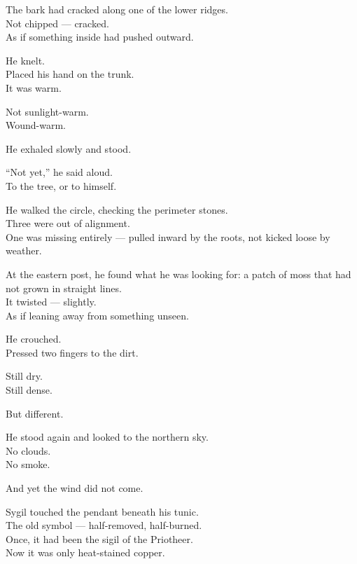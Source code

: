 \documentclass[12pt]{article}
\begin{document}
The bark had cracked along one of the lower ridges.\\
Not chipped — cracked.\\
As if something inside had pushed outward.

\vspace{1em}

He knelt.\\
Placed his hand on the trunk.\\
It was warm.

Not sunlight-warm.\\
Wound-warm.

He exhaled slowly and stood.

\vspace{1em}

“Not yet,” he said aloud.\\
To the tree, or to himself.

\vspace{1em}

He walked the circle, checking the perimeter stones.\\
Three were out of alignment.\\
One was missing entirely — pulled inward by the roots, not kicked loose by weather.

At the eastern post, he found what he was looking for: a patch of moss that had not grown in straight lines.\\
It twisted — slightly.\\
As if leaning away from something unseen.

\vspace{1em}

He crouched.\\
Pressed two fingers to the dirt.

Still dry.\\
Still dense.

But different.

\vspace{1em}

He stood again and looked to the northern sky.\\
No clouds.\\
No smoke.

And yet the wind did not come.

\vspace{1em}

Sygil touched the pendant beneath his tunic.\\
The old symbol — half-removed, half-burned.\\
Once, it had been the sigil of the Priotheer.\\
Now it was only heat-stained copper.
\end{document}
